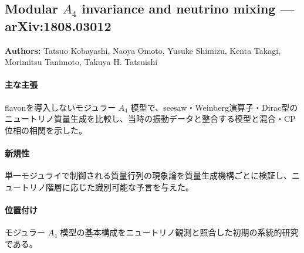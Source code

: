 \subsection{Modular $A_4$ invariance and neutrino mixing --- arXiv:1808.03012}

\textbf{Authors:} Tatsuo Kobayashi, Naoya Omoto, Yusuke Shimizu, Kenta Takagi, Morimitsu Tanimoto, Takuya H. Tatsuishi

\paragraph{主な主張}
flavonを導入しないモジュラー $A_4$ 模型で、seesaw・Weinberg演算子・Dirac型のニュートリノ質量生成を比較し、当時の振動データと整合する模型と混合・CP位相の相関を示した\cite{Kobayashi:2018scp}。

\paragraph{新規性}
単一モジュライで制御される質量行列の現象論を質量生成機構ごとに検証し、ニュートリノ階層に応じた識別可能な予言を与えた。

\paragraph{位置付け}
モジュラー $A_4$ 模型の基本構成をニュートリノ観測と照合した初期の系統的研究である。
